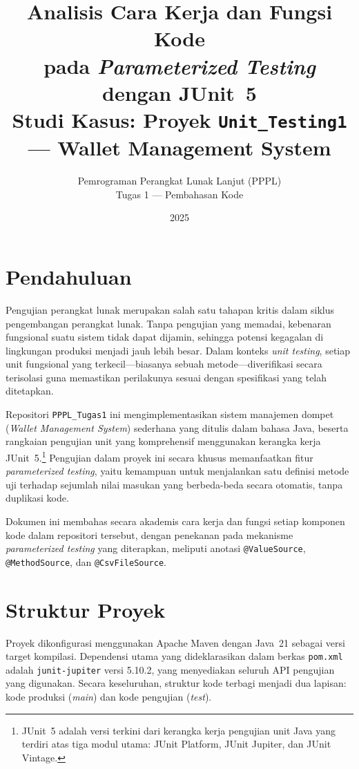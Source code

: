 \documentclass[12pt,a4paper]{article}
\title{%
  \textbf{Analisis Cara Kerja dan Fungsi Kode\\
  pada \textit{Parameterized Testing} dengan JUnit~5}\\[4pt]
  \large Studi Kasus: Proyek \texttt{Unit\_Testing1} --- Wallet Management System
}
\author{%
  Pemrograman Perangkat Lunak Lanjut (PPPL)\\
  Tugas 1 --- Pembahasan Kode
}
\date{2025}
\begin{document}
\maketitle
\tableofcontents
\newpage

\section{Pendahuluan}

Pengujian perangkat lunak merupakan salah satu tahapan kritis dalam siklus pengembangan
perangkat lunak.  Tanpa pengujian yang memadai, kebenaran fungsional suatu sistem tidak
dapat dijamin, sehingga potensi kegagalan di lingkungan produksi menjadi jauh lebih
besar.  Dalam konteks \textit{unit testing}, setiap unit fungsional yang terkecil---biasanya
sebuah metode---diverifikasi secara terisolasi guna memastikan perilakunya sesuai dengan
spesifikasi yang telah ditetapkan.

Repositori \texttt{PPPL\_Tugas1} ini mengimplementasikan sistem manajemen dompet
(\textit{Wallet Management System}) sederhana yang ditulis dalam bahasa Java, beserta
rangkaian pengujian unit yang komprehensif menggunakan kerangka kerja
JUnit~5.\footnote{JUnit~5 adalah versi terkini dari kerangka kerja pengujian unit Java
yang terdiri atas tiga modul utama: JUnit Platform, JUnit Jupiter, dan JUnit Vintage.}
Pengujian dalam proyek ini secara khusus memanfaatkan fitur \textit{parameterized testing},
yaitu kemampuan untuk menjalankan satu definisi metode uji terhadap sejumlah nilai
masukan yang berbeda-beda secara otomatis, tanpa duplikasi kode.

Dokumen ini membahas secara akademis cara kerja dan fungsi setiap komponen kode dalam
repositori tersebut, dengan penekanan pada mekanisme \textit{parameterized testing} yang
diterapkan, meliputi anotasi \texttt{@ValueSource}, \texttt{@MethodSource}, dan
\texttt{@CsvFileSource}.

\section{Struktur Proyek}

Proyek dikonfigurasi menggunakan Apache Maven dengan Java~21 sebagai versi target
kompilasi.  Dependensi utama yang dideklarasikan dalam berkas \texttt{pom.xml} adalah
\texttt{junit-jupiter} versi 5.10.2, yang menyediakan seluruh API pengujian yang
digunakan.  Secara keseluruhan, struktur kode terbagi menjadi dua lapisan: kode produksi
(\textit{main}) dan kode pengujian (\textit{test}).
\end{document}
